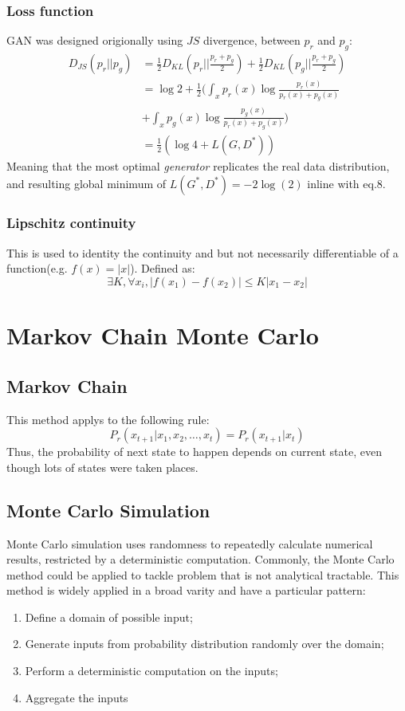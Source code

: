 \documentclass{article}
\begin{document}
\subsubsection*{Loss function}
GAN was designed origionally using $JS$ divergence, between $p_{r}$ and $p_{g}$:
\begin{align}
    D_{JS}(p_{r}||p_{g}) &= \frac{1}{2}D_{KL}(p_{r}||\frac{p_{r}+p_{g}}{2}) + \frac{1}{2}D_{KL}(p_{g}||\frac{p_{r}+p_{g}}{2}) \\
    &= \log{2} + \frac{1}{2}(\int_{x}p_{r}(x)\log{
        \frac{p_{r}(x)}{p_{r}(x)+p_{g}(x)}}\\
        &+\int_{x}p_{g}(x)\log{\frac{p_{g}(x)}{p_{r}(x)+p_{g}(x)}})\\
    &= \frac{1}{2}(\log{4}+L(G,D^*))    
\end{align}
Meaning that the most optimal \textit{generator} replicates the real data distribution, and resulting global minimum of $L(G^*,D^*) = -2\log(2)$ inline with eq.8.
\subsubsection*{Lipschitz continuity}
This is used to identity the continuity and but not necessarily differentiable of a function(e.g. $f(x) = |x|$). Defined as:
\[
\exists K, \forall x_{i}, |f(x_{1}) - f(x_{2})| \leq K|x_{1}-x_{2}|    
\]
\section{Markov Chain Monte Carlo}
\subsection{Markov Chain}
This method applys to the following rule:
\[
P_{r}(x_{t+1}|x_{1},x_{2},\dots ,x_{t}) = P_{r}(x_{t+1}|x_{t})
\]
Thus, the probability of next state to happen depends on current state, even though lots of states were taken places.
\subsection{Monte Carlo Simulation}
Monte Carlo simulation uses randomness to repeatedly calculate numerical results, restricted by a deterministic computation. Commonly, the Monte Carlo method could be applied to tackle problem that is not analytical tractable. This method is widely applied in a broad varity and have a particular pattern: \\
\begin{enumerate}
\item Define a domain of possible input;
\item Generate inputs from probability distribution randomly over the domain;
\item Perform a deterministic computation on the inputs;
\item Aggregate the inputs
\end{enumerate}
\end{document}
